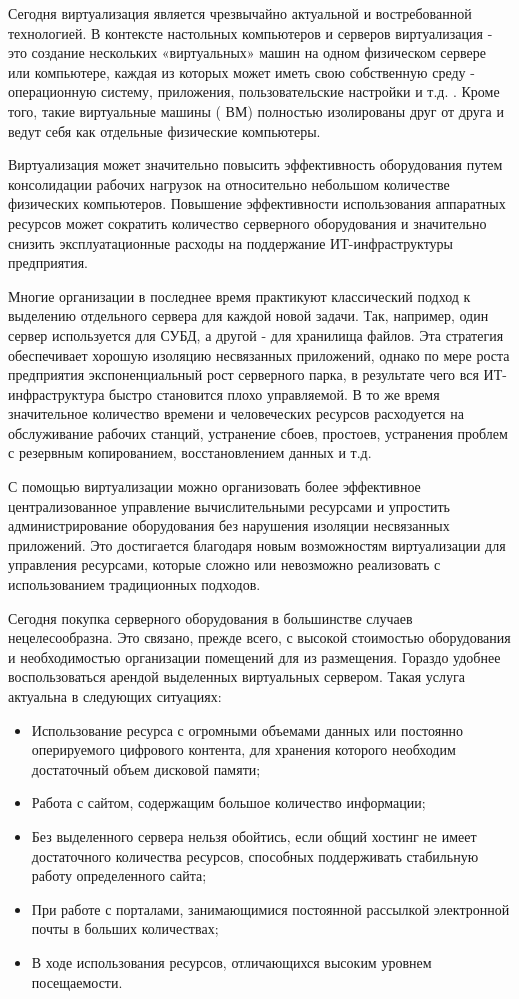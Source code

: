 {\actuality}
Сегодня виртуализация является чрезвычайно актуальной и востребованной технологией. В контексте настольных компьютеров и серверов виртуализация - это создание нескольких «виртуальных» машин на одном физическом сервере или компьютере, каждая из которых может иметь свою собственную среду - операционную систему, приложения, пользовательские настройки и т.д. . Кроме того, такие виртуальные машины ( ВМ) полностью изолированы друг от друга и ведут себя как отдельные физические компьютеры.

Виртуализация может значительно повысить эффективность оборудования путем консолидации рабочих нагрузок на относительно небольшом количестве физических компьютеров. Повышение эффективности использования аппаратных ресурсов может сократить количество серверного оборудования и значительно снизить эксплуатационные расходы на поддержание ИТ-инфраструктуры предприятия.

Многие организации в последнее время практикуют классический подход к выделению отдельного сервера для каждой новой задачи. Так, например, один сервер используется для СУБД, а другой - для хранилища файлов. Эта стратегия обеспечивает хорошую изоляцию несвязанных приложений, однако по мере роста предприятия экспоненциальный рост серверного парка, в результате чего вся ИТ-инфраструктура быстро становится плохо управляемой. В то же время значительное количество времени и человеческих ресурсов расходуется на обслуживание рабочих станций, устранение сбоев, простоев, устранения проблем с резервным копированием, восстановлением данных и т.д.

С помощью виртуализации можно организовать более эффективное централизованное управление вычислительными ресурсами и упростить администрирование оборудования без нарушения изоляции несвязанных приложений. Это достигается благодаря новым возможностям виртуализации для управления ресурсами, которые сложно или невозможно реализовать с использованием традиционных подходов.

Сегодня покупка серверного оборудования в большинстве случаев нецелесообразна. Это связано, прежде всего, с высокой стоимостью оборудования и необходимостью организации помещений для из размещения. Гораздо удобнее воспользоваться арендой выделенных виртуальных сервером. Такая услуга актуальна в следующих ситуациях:
\begin{itemize}
  \item Использование ресурса с огромными объемами данных или постоянно оперируемого цифрового контента, для хранения которого необходим достаточный объем дисковой памяти;
  \item Работа с сайтом, содержащим большое количество информации;
  \item Без выделенного сервера нельзя обойтись, если общий хостинг не имеет достаточного количества ресурсов, способных поддерживать стабильную работу определенного сайта;
  \item При работе с порталами, занимающимися постоянной рассылкой электронной почты в больших количествах;
  \item В ходе использования ресурсов, отличающихся высоким уровнем посещаемости.
\end{itemize}

